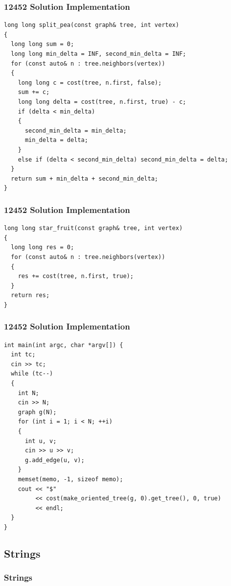 \documentclass{beamer}
\begin{document}
\begin{frame}[fragile]
\frametitle{12452 Solution Implementation}

\scriptsize
\begin{lstlisting}
long long split_pea(const graph& tree, int vertex)
{
  long long sum = 0;
  long long min_delta = INF, second_min_delta = INF;
  for (const auto& n : tree.neighbors(vertex))
  {
    long long c = cost(tree, n.first, false);
    sum += c;
    long long delta = cost(tree, n.first, true) - c;
    if (delta < min_delta)
    {
      second_min_delta = min_delta;
      min_delta = delta;
    }
    else if (delta < second_min_delta) second_min_delta = delta;
  }
  return sum + min_delta + second_min_delta;
}
\end{lstlisting}

\end{frame}

\begin{frame}[fragile]
\frametitle{12452 Solution Implementation}

\scriptsize
\begin{lstlisting}
long long star_fruit(const graph& tree, int vertex)
{
  long long res = 0;
  for (const auto& n : tree.neighbors(vertex))
  {
    res += cost(tree, n.first, true);
  }
  return res;
}
\end{lstlisting}

\end{frame}

\begin{frame}[fragile]
\frametitle{12452 Solution Implementation}

\scriptsize
\begin{lstlisting}
int main(int argc, char *argv[]) {
  int tc;
  cin >> tc;
  while (tc--)
  {
    int N;
    cin >> N;
    graph g(N);
    for (int i = 1; i < N; ++i)
    {
      int u, v;
      cin >> u >> v;
      g.add_edge(u, v);
    }
    memset(memo, -1, sizeof memo);
    cout << "$"
         << cost(make_oriented_tree(g, 0).get_tree(), 0, true)
         << endl;
  }
}
\end{lstlisting}

\end{frame}

\fi

\subsection{Strings}

\begin{frame}%
\frametitle{Strings}

\end{frame}
\end{document}
